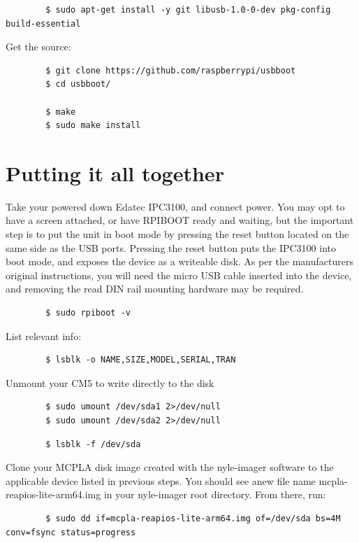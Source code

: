 \documentclass[]{article}
\begin{document}
	\begin{verbatim}
		$ sudo apt-get install -y git libusb-1.0-0-dev pkg-config build-essential
	\end{verbatim}
	
	Get the source:
	
	\begin{verbatim}
		$ git clone https://github.com/raspberrypi/usbboot
		$ cd usbboot/

		$ make
		$ sudo make install
	\end{verbatim}
	
	\section*{Putting it all together}
	Take your powered down Edatec IPC3100, and connect power. You may opt to have a screen attached, or have RPIBOOT ready and waiting, but the important step is to
	put the unit in boot mode by pressing the reset button located on the same side as the USB ports. Pressing the reset button puts the IPC3100 into boot mode, and exposes the
	device as a writeable disk. As per the manufacturers original instructions, you will need the micro USB cable inserted into the device, and removing the read DIN rail mounting hardware may be required.
	
	\begin{verbatim}
		$ sudo rpiboot -v
	\end{verbatim}
	
	List relevant info:
	
	\begin{verbatim}
		$ lsblk -o NAME,SIZE,MODEL,SERIAL,TRAN
	\end{verbatim}
	
	Unmount your CM5 to write directly to the disk
	
	\begin{verbatim}
		$ sudo umount /dev/sda1 2>/dev/null
		$ sudo umount /dev/sda2 2>/dev/null
	\end{verbatim}
	
	\begin{verbatim}
		$ lsblk -f /dev/sda
	\end{verbatim}
	
	Clone your MCPLA disk image created with the nyle-imager software to the applicable device listed in previous steps.
	You should see anew file name mcpla-reapios-lite-arm64.img in your nyle-imager root directory. From there, run:
	\begin{verbatim}
		$ sudo dd if=mcpla-reapios-lite-arm64.img of=/dev/sda bs=4M conv=fsync status=progress
	\end{verbatim}
	
\end{document}
